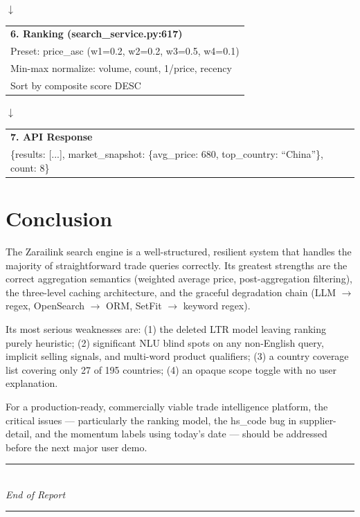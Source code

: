 \documentclass[12pt,a4paper]{article}
\begin{document}
\begin{center}
$\downarrow$

\begin{tabular}{|l|}
\hline
\textbf{6. Ranking (search\_service.py:617)} \\
Preset: price\_asc (w1=0.2, w2=0.2, w3=0.5, w4=0.1) \\
Min-max normalize: volume, count, 1/price, recency \\
Sort by composite score DESC \\
\hline
\end{tabular}

$\downarrow$

\begin{tabular}{|l|}
\hline
\textbf{7. API Response} \\
\{results: [...], market\_snapshot: \{avg\_price: 680, top\_country: ``China''\}, count: 8\} \\
\hline
\end{tabular}
\end{center}

\section{Conclusion}

The Zarailink search engine is a well-structured, resilient system that handles the
majority of straightforward trade queries correctly. Its greatest strengths are the
correct aggregation semantics (weighted average price, post-aggregation filtering),
the three-level caching architecture, and the graceful degradation chain (LLM $\rightarrow$ regex,
OpenSearch $\rightarrow$ ORM, SetFit $\rightarrow$ keyword regex).

Its most serious weaknesses are: (1) the deleted LTR model leaving ranking purely
heuristic; (2) significant NLU blind spots on any non-English query, implicit selling
signals, and multi-word product qualifiers; (3) a country coverage list covering only
27 of 195 countries; (4) an opaque scope toggle with no user explanation.

For a production-ready, commercially viable trade intelligence platform, the critical
issues --- particularly the ranking model, the hs\_code bug in supplier-detail, and the
momentum labels using today's date --- should be addressed before the next major user demo.

\vspace{2em}
\begin{center}
\rule{6cm}{0.4pt}\\
\textit{End of Report}\\
\rule{6cm}{0.4pt}
\end{center}
\end{document}
